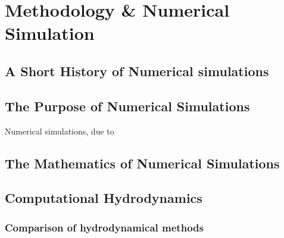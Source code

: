 \chapter{Methodology \& Numerical Simulation}
\label{ch:numsim}




\section{A Short History of Numerical simulations}
\label{sec:numsim}




\section{The Purpose of Numerical Simulations}
\label{sec:numerical-purpose}





Numerical simulations, due to 


\section{The Mathematics of Numerical Simulations}
\label{sec:numerical-math}






\section{Computational Hydrodynamics}
\label{sec:hydrodynamics}

\subsection{Comparison of hydrodynamical methods}

